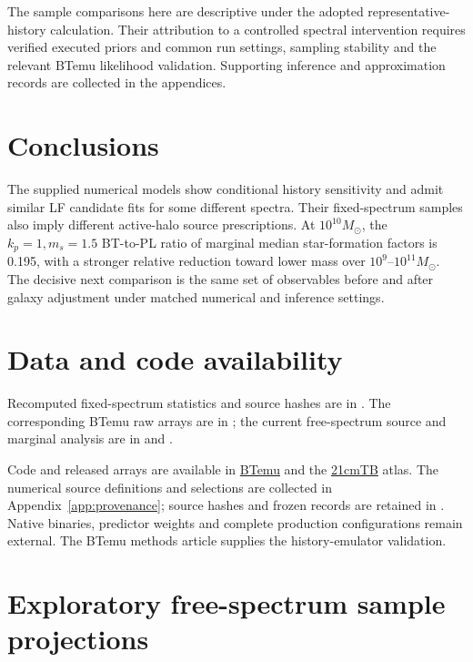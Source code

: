 The sample comparisons here are descriptive under the adopted representative-history calculation. Their attribution to a controlled spectral intervention requires verified executed priors and common run settings, sampling stability and the relevant BTemu likelihood validation. Supporting inference and approximation records are collected in the appendices.

\section{Conclusions}\label{conclusions}

The supplied numerical models show conditional history sensitivity and admit similar LF candidate fits for some different spectra. Their fixed-spectrum samples also imply different active-halo source prescriptions. At $10^{10}M_\odot$, the $k_p=1,m_s=1.5$ BT-to-PL ratio of marginal median star-formation factors is 0.195, with a stronger relative reduction toward lower mass over $10^9$--$10^{11}M_\odot$. The decisive next comparison is the same set of observables before and after galaxy adjustment under matched numerical and inference settings.

\section*{Data and code availability}

Recomputed fixed-spectrum statistics and source hashes are in . The corresponding BTemu raw arrays are in ; the current free-spectrum source and marginal analysis are in  and .

Code and released arrays are available in \href{https://github.com/HainaHuang729/BTemu}{BTemu} and the \href{https://github.com/HainaHuang729/21cmTB}{21cmTB} atlas. The numerical source definitions and selections are collected in Appendix~\ref{app:provenance}; source hashes and frozen records are retained in . Native binaries, predictor weights and complete production configurations remain external. The BTemu methods article supplies the history-emulator validation.

\clearpage


\clearpage\appendix
\setcounter{figure}{0}

\section{Exploratory free-spectrum sample projections}\label{app:free-spectrum-exploration}\label{physics-current-inference}

